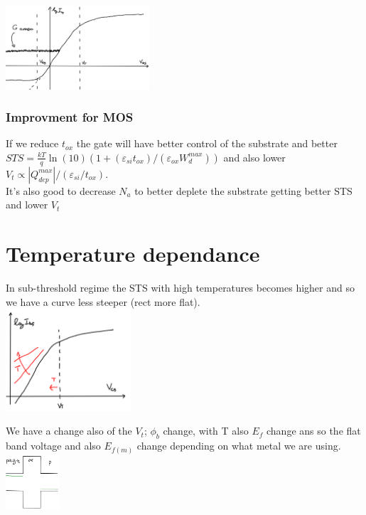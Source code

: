 \centering
\includegraphics[width=0.4\textwidth]{noisefloor.png}\\
\raggedright

\subsubsection{Improvment for MOS}
If we reduce $t_{ox}$ the gate will have better control of the substrate and better $STS=\frac{kT}{q}\ln(10)(1+(\varepsilon_{si}t_{ox})/(\varepsilon_{ox}W_d^{max}))$ and also lower $V_t\propto|Q_{dep}^{max}|/(\varepsilon_{si}/t_{ox})$.\\
It's also good to decrease $N_a$ to better deplete the substrate getting better STS and lower $V_t$


\section{Temperature dependance}
In sub-threshold regime the STS with high temperatures becomes higher and so we have a curve less steeper (rect more flat).\\


\centering
\includegraphics[width=0.35\textwidth]{tchange.png}\\
\raggedright

We have a change also of the $V_t$; $\phi_b$ change, with T also $E_f$ change ans so the flat band voltage and also $E_{f(m)}$ change depending on what metal we are using.\\


\centering
\includegraphics[width=0.15\textwidth]{1tchange.png}\\
\raggedright


